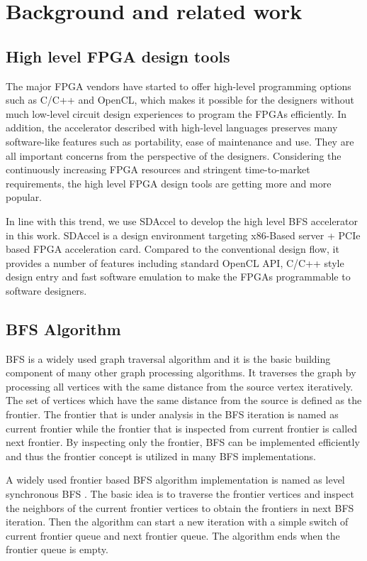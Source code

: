\section{Background and related work} \label{sec:relatedwork}
\subsection{High level FPGA design tools}
The major FPGA vendors have started 
to offer high-level programming options such as C/C++ and OpenCL, which makes 
it possible for the designers without much low-level circuit design 
experiences \cite{nimbix, xilinx-sdaccel, intel-opencl} 
to program the FPGAs efficiently. In addition, the accelerator 
described with high-level languages preserves many software-like features 
such as portability, ease of maintenance and use. They are all 
important concerns from the perspective of the designers. Considering the  
continuously increasing FPGA resources and stringent time-to-market requirements, 
the high level FPGA design tools \cite{Nane2016hls-survey} are getting more and more 
popular.

In line with this trend, we use SDAccel \cite{xilinx-sdaccel} to develop the 
high level BFS accelerator in this work. SDAccel is a design environment 
targeting x86-Based server + PCIe based FPGA acceleration card. 
Compared to the conventional design flow, it provides 
a number of features including standard OpenCL API, C/C++ style design entry and
fast software emulation to make the FPGAs programmable to software designers. 


\subsection{BFS Algorithm}
BFS is a widely used graph traversal algorithm and it is the basic 
building component of many other graph processing algorithms. 
It traverses the graph by processing all vertices with the same distance from the 
source vertex iteratively. The set of vertices which have the same distance from the 
source is defined as the frontier. The frontier that is under analysis in the BFS iteration 
is named as current frontier while the frontier that is inspected from current frontier 
is called next frontier. By inspecting only the frontier, BFS can be implemented efficiently 
and thus the frontier concept is utilized in many BFS implementations.

A widely used frontier based BFS algorithm implementation is named as 
level synchronous BFS \cite{attia2014cygraph, betkaoui2012reconfigurable, 
zhang2017boosting}. The basic idea is to traverse the frontier vertices and inspect the neighbors 
of the current frontier vertices to obtain the frontiers in next BFS iteration. 
Then the algorithm can start a new iteration with a simple switch of 
current frontier queue and next frontier queue. The algorithm ends when 
the frontier queue is empty.

